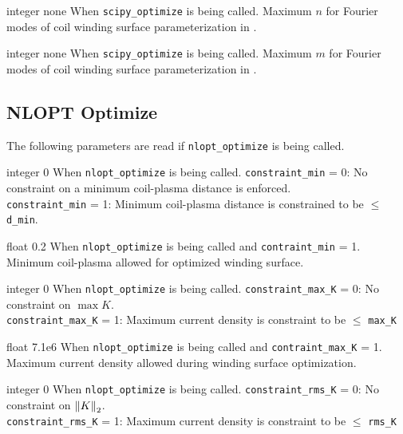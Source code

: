 \myhrule

{integer}
{none}
{When \texttt{scipy\_optimize} is being called.}
{Maximum $n$ for Fourier modes of coil winding surface parameterization in .}

\myhrule

{integer}
{none}
{When \texttt{scipy\_optimize} is being called.}
{Maximum $m$ for Fourier modes of coil winding surface parameterization in .}

\myhrule

\subsection{NLOPT Optimize}

The following parameters are read if \texttt{nlopt\_optimize} is being called. 

{integer}
{0}
{When \texttt{nlopt\_optimize} is being called.}
{\texttt{constraint\_min} = 0: No constraint on a minimum coil-plasma distance is enforced. \\
 \texttt{constraint\_min} = 1: Minimum coil-plasma distance is constrained to be $\leq$ \texttt{d\_min}. }
 
\myhrule

{float}
{0.2}
{When \texttt{nlopt\_optimize} is being called and \texttt{contraint\_min} = 1.}
{Minimum coil-plasma allowed for optimized winding surface.}
 
 \myhrule
 
{integer}
{0}
{When \texttt{nlopt\_optimize} is being called.}
{\texttt{constraint\_max\_K} = 0: No constraint on $\max K$. \\
 \texttt{constraint\_max\_K} = 1: Maximum current density is constraint to be $\leq$ \texttt{max\_K}}
 
\myhrule

{float}
{7.1e6}
{When \texttt{nlopt\_optimize} is being called and \texttt{contraint\_max\_K} = 1.}
{Maximum current density allowed during winding surface optimization. }

\myhrule

{integer}
{0}
{When \texttt{nlopt\_optimize} is being called.}
{\texttt{constraint\_rms\_K} = 0: No constraint on $\norm{K}_2$. \\
 \texttt{constraint\_rms\_K} = 1: Maximum current density is constraint to be $\leq$ \texttt{rms\_K}}
 

